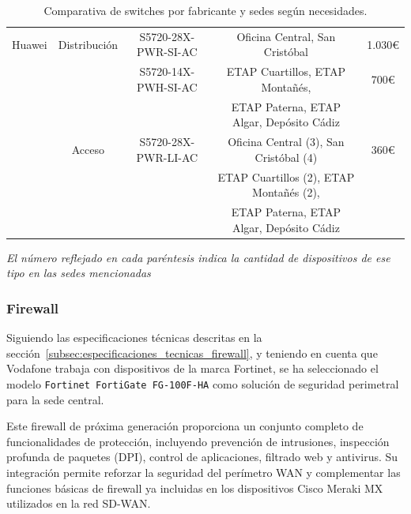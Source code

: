 \begin{table}[H]
{\begin{tabular}{|c|c|c|c|c|}
			Huawei              & Distribución & S5720-28X-PWR-SI-AC     & Oficina Central, San Cristóbal           & 1.030€                 \\ \cline{3-5}
			                    &              & S5720-14X-PWH-SI-AC     & ETAP Cuartillos, ETAP Montañés,          & 700€                   \\
			                    &              &                         & ETAP Paterna, ETAP Algar, Depósito Cádiz &                        \\ \cline{2-5}
			                    & Acceso       & S5720-28X-PWR-LI-AC     & Oficina Central (3), San Cristóbal (4)   & 360€                   \\
			                    &              &                         & ETAP Cuartillos (2), ETAP Montañés (2),  &                        \\
			                    &              &                         & ETAP Paterna, ETAP Algar, Depósito Cádiz &                        \\ \hline
		\end{tabular}%
	}
	\caption{Comparativa de switches por fabricante y sedes según necesidades.}
	\begin{tcolorbox}[colback=gray!10!white, colframe=gray!70!black, title=NOTA:, size=title]
		\textit{El número reflejado en cada paréntesis indica la cantidad de dispositivos de ese tipo en las sedes mencionadas}
	\end{tcolorbox}
	\label{tab:switches}
\end{table}
\renewcommand{\arraystretch}{1} %

\subsubsection{Firewall}
Siguiendo las especificaciones técnicas descritas en la sección~\ref{subsec:especificaciones_tecnicas_firewall}, y teniendo en cuenta que Vodafone trabaja con dispositivos de la marca Fortinet, se ha seleccionado el modelo \texttt{Fortinet FortiGate FG-100F-HA} como solución de seguridad perimetral para la sede central.

\vspace{0.5cm}
Este firewall de próxima generación proporciona un conjunto completo de funcionalidades de protección, incluyendo prevención de intrusiones, inspección profunda de paquetes (DPI), control de aplicaciones, filtrado web y antivirus. Su integración permite reforzar la seguridad del perímetro WAN y complementar las funciones básicas de firewall ya incluidas en los dispositivos Cisco Meraki MX utilizados en la red SD-WAN.

